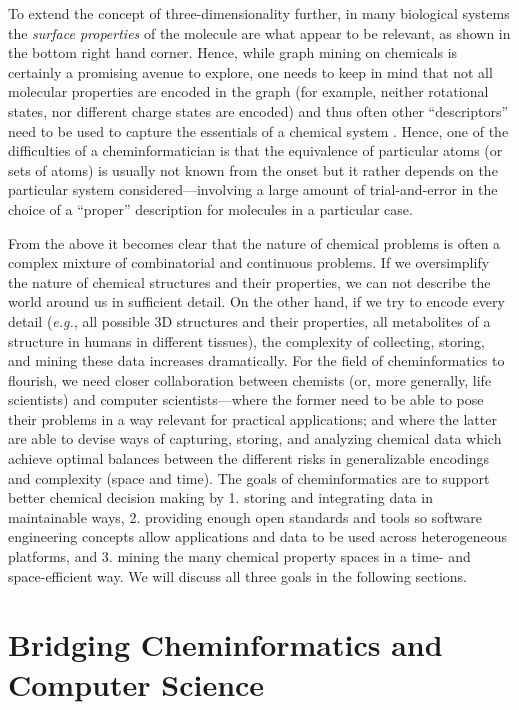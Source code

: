 \documentclass{sig-alternate}
\begin{document}
To extend the concept of three-dimensionality further, in many
biological systems the \emph{surface properties} of the molecule are
what appear to be relevant, as shown in the bottom right hand corner.
Hence, while graph mining on chemicals is certainly a promising avenue
to explore, one needs to keep in mind that not all molecular
properties are encoded in the graph (for example, neither rotational
states, nor different charge states are encoded) and thus often other
``descriptors'' need to be used to capture the essentials of a
chemical system \cite{bender2004}. Hence, one of the difficulties of a
cheminformatician is that the equivalence of particular atoms (or sets
of atoms) is usually not known from the onset but it rather depends on
the particular system considered---involving a large amount of
trial-and-error in the choice of a ``proper'' description for
molecules in a particular case.

From the above it becomes clear that the nature of chemical problems
is often a complex mixture of combinatorial and continuous
problems. If we oversimplify the nature of chemical structures and
their properties, we can not describe the world around us in
sufficient detail. On the other hand, if we try to encode every detail
(\emph{e.g.}, all possible 3D structures and their properties, all
metabolites of a structure in humans in different tissues), the
complexity of collecting, storing, and mining these data increases
dramatically. For the field of cheminformatics to flourish, we need
closer collaboration between chemists (or, more generally, life
scientists) and computer scientists---where the former need to be able
to pose their problems in a way relevant for practical applications;
and where the latter are able to devise ways of capturing, storing,
and analyzing chemical data which achieve optimal balances between the different risks in
generalizable encodings and complexity (space and time). The goals of cheminformatics are to
support better chemical decision making by 1. storing and integrating
data in maintainable ways, 2.  providing enough open standards and
tools so software engineering concepts allow applications and data to
be used across heterogeneous platforms, and 3. mining the many
chemical property spaces in a time- and space-efficient way. We will
discuss all three goals in the following sections.

\section{Bridging Cheminformatics and Computer Science}
\end{document}
